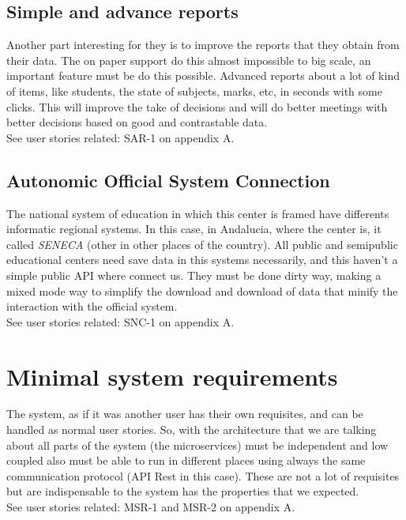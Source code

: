 \subsection{Simple and advance reports}

Another part interesting for they is to improve the reports that they obtain from
their data. The on paper support do this almost impossible to big scale, an
important feature must be do this possible. Advanced reports about a lot of kind
of items, like students, the state of subjects, marks, etc, in seconds with some clicks.
This will improve the take of decisions and will do better meetings with better
decisions based on good and contrastable data.
\\
See user stories related: SAR-1 on appendix A.

\subsection{Autonomic Official System Connection}

The national system of education in which this center is framed have differents
informatic regional systems. In this case, in Andalucia, where the center is, it called
\textit{SENECA} (other in other places of the country). All public and semipublic educational
centers need save data in this systems necessarily, and this haven't a simple public
API where connect us. They must be done dirty way, making a mixed mode way to simplify
the download and download of data that minify the interaction with the official system.
\\
See user stories related: SNC-1 on appendix A.

\section{Minimal system requirements}

The system, as if it was another user has their own requisites,
and can be handled as normal user stories.
So, with the architecture that we are talking about all parts of the system
(the microservices) must be independent and low coupled also must be able to run
in different places using always the same communication protocol (API Rest in this case).
These are not a lot of requisites but are indispensable to the system has the properties
that we expected.
\\
See user stories related: MSR-1 and MSR-2 on appendix A.
